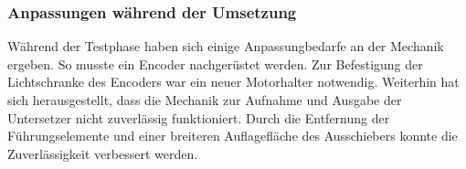 \subsubsection*{Anpassungen während der Umsetzung}
Während der Testphase haben sich einige Anpassungbedarfe an der Mechanik ergeben. So musste ein Encoder nachgerüstet werden.
Zur Befestigung der Lichtschranke des Encoders war ein neuer Motorhalter notwendig. Weiterhin hat sich herausgestellt,
dass die Mechanik zur Aufnahme und Ausgabe der Untersetzer nicht zuverlässig funktioniert. Durch die Entfernung der
Führungselemente und einer breiteren Auflagefläche des Ausschiebers konnte die Zuverlässigkeit verbessert werden.